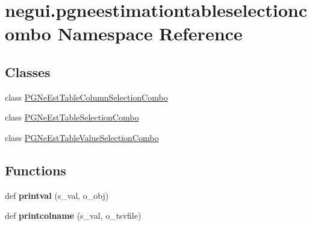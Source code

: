 \hypertarget{namespacenegui_1_1pgneestimationtableselectioncombo}{}\section{negui.\+pgneestimationtableselectioncombo Namespace Reference}
\label{namespacenegui_1_1pgneestimationtableselectioncombo}
\subsection*{Classes}
\begin{DoxyCompactItemize}
\item 
class \hyperlink{classnegui_1_1pgneestimationtableselectioncombo_1_1PGNeEstTableColumnSelectionCombo}{P\+G\+Ne\+Est\+Table\+Column\+Selection\+Combo}
\item 
class \hyperlink{classnegui_1_1pgneestimationtableselectioncombo_1_1PGNeEstTableSelectionCombo}{P\+G\+Ne\+Est\+Table\+Selection\+Combo}
\item 
class \hyperlink{classnegui_1_1pgneestimationtableselectioncombo_1_1PGNeEstTableValueSelectionCombo}{P\+G\+Ne\+Est\+Table\+Value\+Selection\+Combo}
\end{DoxyCompactItemize}
\subsection*{Functions}
\begin{DoxyCompactItemize}
\item 
def {\bfseries printval} (s\+\_\+val, o\+\_\+obj)\hypertarget{namespacenegui_1_1pgneestimationtableselectioncombo_aca291c244db09c479f0b264cd499d22e}{}\label{namespacenegui_1_1pgneestimationtableselectioncombo_aca291c244db09c479f0b264cd499d22e}

\item 
def {\bfseries printcolname} (s\+\_\+val, o\+\_\+tsvfile)\hypertarget{namespacenegui_1_1pgneestimationtableselectioncombo_a82b72168d0860a06247c668a42e54244}{}\label{namespacenegui_1_1pgneestimationtableselectioncombo_a82b72168d0860a06247c668a42e54244}

\end{DoxyCompactItemize}
